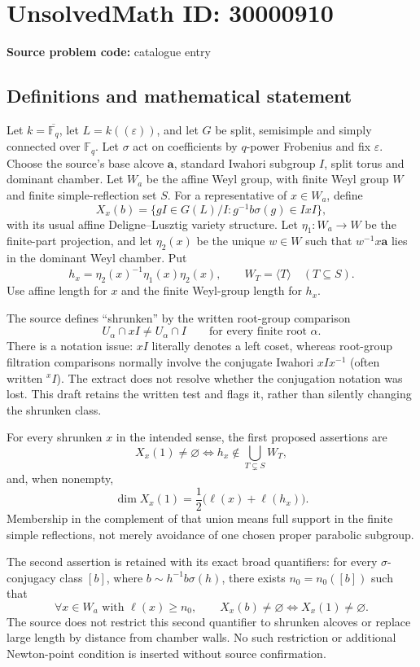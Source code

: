\documentclass[11pt]{article}
\newcommand{\F}{\mathbb{F}}
\begin{document}
\section*{UnsolvedMath ID: 30000910}
\textbf{Source problem code:} catalogue entry
\subsection{Definitions and mathematical statement}
Let $k=\overline{\F_q}$, let $L=k((\varepsilon))$, and let $G$ be split, semisimple and simply connected over $\F_q$. Let $\sigma$ act on coefficients by $q$-power Frobenius and fix $\varepsilon$. Choose the source's base alcove $\mathbf a$, standard Iwahori subgroup $I$, split torus and dominant chamber. Let $W_a$ be the affine Weyl group, with finite Weyl group $W$ and finite simple-reflection set $S$. For a representative of $x\in W_a$, define
\[
X_x(b)=\{gI\in G(L)/I:g^{-1}b\sigma(g)\in IxI\},
\]
with its usual affine Deligne--Lusztig variety structure. Let $\eta_1:W_a\to W$ be the finite-part projection, and let $\eta_2(x)$ be the unique $w\in W$ such that $w^{-1}x\mathbf a$ lies in the dominant Weyl chamber. Put
\[
h_x=\eta_2(x)^{-1}\eta_1(x)\eta_2(x),\qquad
W_T=\langle T\rangle\quad(T\subseteq S).
\]
Use affine length for $x$ and the finite Weyl-group length for $h_x$.

The source defines ``shrunken'' by the written root-group comparison
\[
U_\alpha\cap xI\ne U_\alpha\cap I
\qquad\text{for every finite root }\alpha.
\]
There is a notation issue: $xI$ literally denotes a left coset, whereas root-group filtration comparisons normally involve the conjugate Iwahori $xIx^{-1}$ (often written ${}^xI$). The extract does not resolve whether the conjugation notation was lost. This draft retains the written test and flags it, rather than silently changing the shrunken class.

For every shrunken $x$ in the intended sense, the first proposed assertions are
\[
X_x(1)\ne\varnothing\iff h_x\notin\bigcup_{T\subsetneq S}W_T,
\]
and, when nonempty,
\[
\dim X_x(1)=\frac12\bigl(\ell(x)+\ell(h_x)\bigr).
\]
Membership in the complement of that union means full support in the finite simple reflections, not merely avoidance of one chosen proper parabolic subgroup.

The second assertion is retained with its exact broad quantifiers: for every $\sigma$-conjugacy class $[b]$, where $b\sim h^{-1}b\sigma(h)$, there exists $n_0=n_0([b])$ such that
\[
\forall x\in W_a\text{ with }\ell(x)\geq n_0,\qquad
X_x(b)\ne\varnothing\iff X_x(1)\ne\varnothing.
\]
The source does not restrict this second quantifier to shrunken alcoves or replace large length by distance from chamber walls. No such restriction or additional Newton-point condition is inserted without source confirmation.
\end{document}
